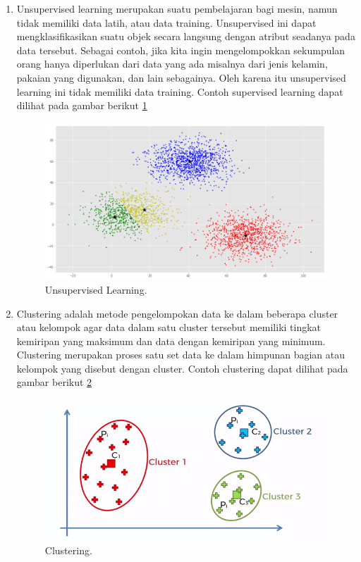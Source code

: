 \begin{enumerate}
\item Unsupervised learning merupakan suatu pembelajaran bagi mesin, namun tidak memiliki data latih, atau data training. Unsupervised ini dapat mengklasifikasikan suatu objek secara langsung dengan atribut seadanya pada data tersebut. Sebagai contoh, jika kita ingin mengelompokkan sekumpulan orang hanya diperlukan dari data yang ada misalnya dari jenis kelamin, pakaian yang digunakan, dan lain sebagainya. Oleh karena itu unsupervised learning ini tidak memiliki data training. Contoh supervised learning dapat dilihat pada gambar berikut \ref{ul}
		\begin{figure}[ht]
		\centerline{\includegraphics[width=1\textwidth]{figures/im/im33.png}}
		\caption{Unsupervised Learning.}
		\label{ul}
		\end{figure}

\item Clustering adalah metode pengelompokan data ke dalam beberapa cluster atau kelompok agar data dalam satu cluster tersebut memiliki tingkat kemiripan yang maksimum dan data dengan kemiripan yang minimum. Clustering merupakan proses satu set data ke dalam himpunan bagian atau kelompok yang disebut dengan cluster. Contoh clustering dapat dilihat pada gambar berikut \ref{c}
		\begin{figure}[ht]
		\centerline{\includegraphics[width=1\textwidth]{figures/im/im44.png}}
		\caption{Clustering.}
		\label{c}
		\end{figure}
\end{enumerate}

